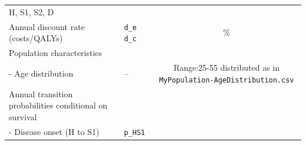\documentclass[
]{article}
\begin{document}
\begin{longtable}[]{@{}llc@{}}
\begin{minipage}[t]{0.21\columnwidth}
H, S1, S2, D\strut
\end{minipage}\tabularnewline
\begin{minipage}[t]{0.51\columnwidth}\raggedright
Annual discount rate (costs/QALYs)\strut
\end{minipage} & \begin{minipage}[t]{0.19\columnwidth}\raggedright
\texttt{d\_e} \texttt{d\_c}\strut
\end{minipage} & \begin{minipage}[t]{0.21\columnwidth}\centering
3\%\strut
\end{minipage}\tabularnewline
\begin{minipage}[t]{0.51\columnwidth}\raggedright
Population characteristics\strut
\end{minipage} & \begin{minipage}[t]{0.19\columnwidth}\raggedright
\strut
\end{minipage} & \begin{minipage}[t]{0.21\columnwidth}\centering
\strut
\end{minipage}\tabularnewline
\begin{minipage}[t]{0.51\columnwidth}\raggedright
- Age distribution\strut
\end{minipage} & \begin{minipage}[t]{0.19\columnwidth}\raggedright
--\strut
\end{minipage} & \begin{minipage}[t]{0.21\columnwidth}\centering
Range:25-55 distributed as in
\texttt{MyPopulation-AgeDistribution.csv}\strut
\end{minipage}\tabularnewline
\begin{minipage}[t]{0.51\columnwidth}\raggedright
Annual transition probabilities conditional on survival\strut
\end{minipage} & \begin{minipage}[t]{0.19\columnwidth}\raggedright
\strut
\end{minipage} & \begin{minipage}[t]{0.21\columnwidth}\centering
\strut
\end{minipage}\tabularnewline
\begin{minipage}[t]{0.51\columnwidth}\raggedright
- Disease onset (H to S1)\strut
\end{minipage} & \begin{minipage}[t]{0.19\columnwidth}\raggedright
\texttt{p\_HS1}\strut
\end{minipage} & \begin{minipage}[t]{0.21\columnwidth}\centering

\end{minipage}
\end{longtable}
\end{document}
